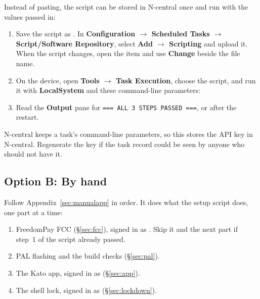 \documentclass[a4paper,10pt]{article}
\begin{document}
\begin{wkinfo}
Instead of pasting, the script can be stored in N-central once and run
with the values passed in:
\begin{enumerate}
  \item Save the script as . In
        \textbf{Configuration $\rightarrow$ Scheduled Tasks $\rightarrow$
        Script/Software Repository}, select \textbf{Add $\rightarrow$
        Scripting} and upload it. When the script changes, open the item
        and use \textbf{Change} beside the file name.
  \item On the device, open \textbf{Tools $\rightarrow$ Task Execution},
        choose the script, and run it with \textbf{LocalSystem} and these
        command-line parameters:\\
  \item Read the \textbf{Output} pane for
        \texttt{=== ALL 3 STEPS PASSED ===}, or
         after the restart.
\end{enumerate}
N-central keeps a task's command-line parameters, so this stores the API
key in N-central. Regenerate the key if the task record could be seen by
anyone who should not have it.
\end{wkinfo}

\subsection{Option B: By hand}\label{sec:manual}

Follow Appendix~\ref{sec:manualapp} in order. It does what the setup script
does, one part at a time:

\begin{enumerate}
  \item FreedomPay FCC (\S\ref{sec:fcc}), signed in as .
        Skip it and the next part if step~1 of the script already passed.
  \item PAL flashing and the build checks (\S\ref{sec:pal}).
  \item The Kato app, signed in as  (\S\ref{sec:app}).
  \item The shell lock, signed in as 
        (\S\ref{sec:lockdown}).
\end{enumerate}

\label{sec:checklist}
\end{document}
